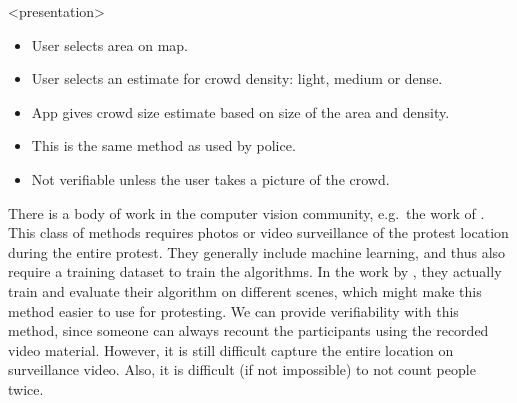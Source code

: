 \begin{frame}<presentation>
  \begin{solution}
    \begin{itemize}
      \item User selects area on map.
      \item User selects an estimate for crowd density: light, medium or dense.
      \item App gives crowd size estimate based on size of the area and 
        density.
    \end{itemize}
  \end{solution}

  \pause

  \begin{remark}
    \begin{itemize}
      \item This is the same method as used by police.
      \item Not verifiable unless the user takes a picture of the crowd.
    \end{itemize}
  \end{remark}
\end{frame}

There is a body of work in the computer vision community, e.g.\ the work of 
\textcite{NNCrowdCounting}.
This class of methods requires photos or video surveillance of the protest 
location during the entire protest.
They generally include machine learning, and thus also require a training 
dataset to train the algorithms.
In the work by \textcite{NNCrowdCounting}, they actually train and evaluate 
their algorithm on different scenes, which might make this method easier to use 
for protesting.
We can provide verifiability with this method, since someone can always recount
the participants using the recorded video material.
However, it is still difficult capture the entire location on surveillance 
video.
Also, it is difficult (if not impossible) to not count people twice.

